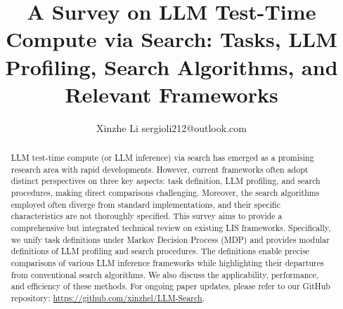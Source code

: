 \documentclass[10pt]{article} %
\title{A Survey on LLM Test-Time Compute via Search: Tasks, LLM Profiling, Search Algorithms, and Relevant Frameworks}
\author{\name Xinzhe Li \email sergioli212@outlook.com }
\begin{document}
\maketitle

\begin{abstract}
   LLM test-time compute (or LLM inference) via search has emerged as a promising research area with rapid developments. However, current frameworks often adopt distinct perspectives on three key aspects: task definition, LLM profiling, and search procedures, making direct comparisons challenging. Moreover, the search algorithms employed often diverge from standard implementations, and their specific characteristics are not thoroughly specified. 
    This survey aims to provide a comprehensive but integrated technical review on existing LIS frameworks. Specifically, we unify task definitions under Markov Decision Process (MDP) and provides modular definitions of LLM profiling and search procedures. 
    The definitions enable precise comparisons of various LLM inference frameworks while highlighting their departures from conventional search algorithms. We also discuss the applicability, performance, and efficiency of these methods.
    For ongoing paper updates, please refer to our GitHub repository: \url{https://github.com/xinzhel/LLM-Search}. 
\end{abstract}














% 
\end{document}
